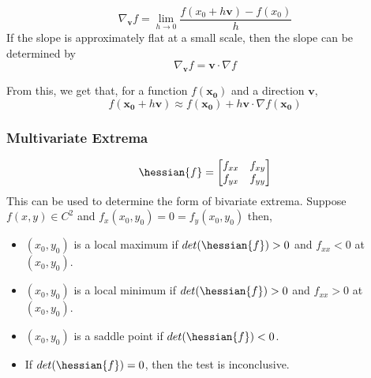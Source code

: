 \begin{equation}
    \nabla_{\mathbf{v}} f = \lim_{h \rightarrow 0}\frac{f(x_0 + h\mathbf{v}) - f(x_0)}{h}
\end{equation}
If the slope is approximately flat at a small scale, then the slope can be determined by
\begin{equation}
    \nabla_{\mathbf{v}} f = \mathbf{v} \cdot \nabla f
\end{equation}

From this, we get that, for a function \(f(\mathbf{x_0})\) and a direction \(\mathbf{v}\),
\begin{equation}
    f(\mathbf{x_0} + h \mathbf{v}) \approx f(\mathbf{x_0}) + h \mathbf{v} \cdot \nabla f(\mathbf{x_0})
\end{equation}

\newpage\subsubsection{Multivariate Extrema}



\begin{equation}
    \hessian{f} = \begin{bmatrix} f_{xx} & f_{xy} \\ f_{yx} & f_{yy} \end{bmatrix}
\end{equation}
This can be used to determine the form of bivariate extrema. Suppose \(f(x,y) \in C^2\) and \(f_x(x_0,y_0) = 0 = f_y(x_0,y_0)\) then,
\begin{itemize}
    \item \((x_0,y_0)\) is a local maximum if \(det(\hessian{f}) > 0\) and \(f_{xx} < 0\) at \((x_0,y_0)\).
    \item \((x_0,y_0)\) is a local minimum if \(det(\hessian{f}) > 0\) and \(f_{xx} > 0\) at \((x_0,y_0)\).
    \item \((x_0,y_0)\) is a saddle point if \(det(\hessian{f}) < 0\).
    \item If \(det(\hessian{f}) = 0\), then the test is inconclusive.
\end{itemize}

